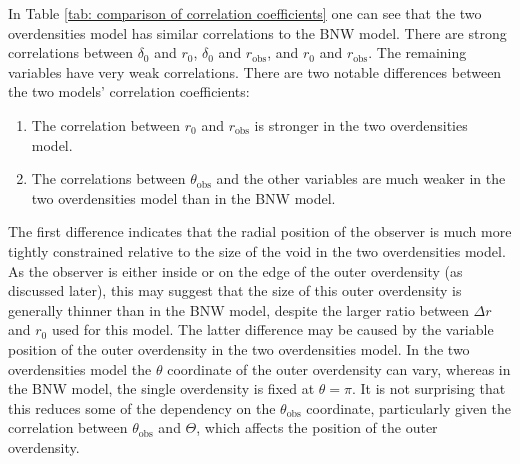 \documentclass[a4paper,12pt]{report}
\begin{document}
In Table \ref{tab: comparison of correlation coefficients} one can see that the two overdensities model has similar correlations to the BNW model. There are strong correlations between $\delta_0$ and $r_0$, $\delta_0$ and $r_\text{obs}$, and $r_0$ and $r_\text{obs}$. The remaining variables have very weak correlations. There are two notable differences between the two models' correlation coefficients:
\begin{enumerate}
    \item The correlation between $r_0$ and $r_\text{obs}$ is stronger in the two overdensities model.
    \item The correlations between $\theta_\text{obs}$ and the other variables are much weaker in the two overdensities model than in the BNW model.
\end{enumerate}
 The first difference indicates that the radial position of the observer is much more tightly constrained relative to the size of the void in the two overdensities model. As the observer is either inside or on the edge of the outer overdensity (as discussed later), this may suggest that the size of this outer overdensity is generally thinner than in the BNW model, despite the larger ratio between $\Delta r$ and $r_0$ used for this model. The latter difference may be caused by the variable position of the outer overdensity in the two overdensities model. In the two overdensities model the $\theta$ coordinate of the outer overdensity can vary, whereas in the BNW model, the single overdensity is fixed at $\theta=\pi$. It is not surprising that this reduces some of the dependency on the $\theta_\text{obs}$ coordinate, particularly given the correlation between $\theta_\text{obs}$ and $\Theta$, which affects the position of the outer overdensity.
\end{document}
